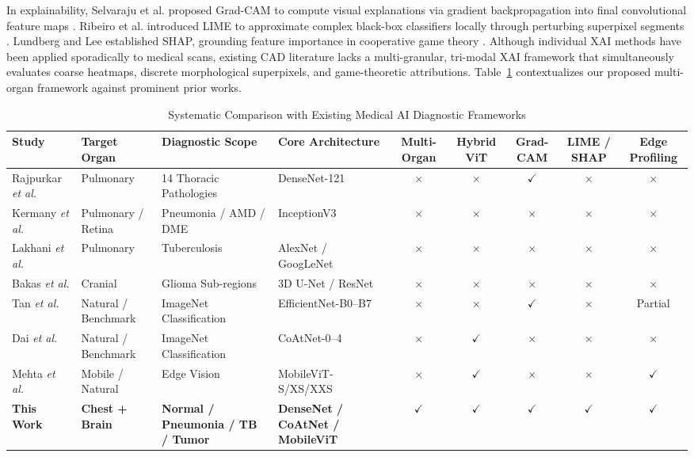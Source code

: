 \documentclass[journal]{IEEEtran}
\begin{document}
In explainability, Selvaraju et al. proposed Grad-CAM to compute visual explanations via gradient backpropagation into final convolutional feature maps \cite{selvaraju2017gradcam}. Ribeiro et al. introduced LIME to approximate complex black-box classifiers locally through perturbing superpixel segments \cite{ribeiro2016lime}. Lundberg and Lee established SHAP, grounding feature importance in cooperative game theory \cite{lundberg2017unified}. Although individual XAI methods have been applied sporadically to medical scans, existing CAD literature lacks a multi-granular, tri-modal XAI framework that simultaneously evaluates coarse heatmaps, discrete morphological superpixels, and game-theoretic attributions. Table~\ref{tab:literature_comparison} contextualizes our proposed multi-organ framework against prominent prior works.

\begin{table}[!t]
\caption{Systematic Comparison with Existing Medical AI Diagnostic Frameworks}
\label{tab:literature_comparison}
\centering
\scriptsize
\renewcommand{\arraystretch}{1.15}
\begin{tabular}{l l l l c c c c c}
\toprule
\textbf{Study} & \textbf{Target Organ} & \textbf{Diagnostic Scope} & \textbf{Core Architecture} & \textbf{Multi-Organ} & \textbf{Hybrid ViT} & \textbf{Grad-CAM} & \textbf{LIME / SHAP} & \textbf{Edge Profiling} \\
\midrule
Rajpurkar \textit{et al.} \cite{rajpurkar2017chexnet} & Pulmonary & 14 Thoracic Pathologies & DenseNet-121 & $\times$ & $\times$ & $\checkmark$ & $\times$ & $\times$ \\
Kermany \textit{et al.} \cite{kermany2018identifying} & Pulmonary / Retina & Pneumonia / AMD / DME & InceptionV3 & $\times$ & $\times$ & $\times$ & $\times$ & $\times$ \\
Lakhani \textit{et al.} \cite{lakhani2017deep} & Pulmonary & Tuberculosis & AlexNet / GoogLeNet & $\times$ & $\times$ & $\times$ & $\times$ & $\times$ \\
Bakas \textit{et al.} \cite{menze2014multimodal} & Cranial & Glioma Sub-regions & 3D U-Net / ResNet & $\times$ & $\times$ & $\times$ & $\times$ & $\times$ \\
Tan \textit{et al.} \cite{tan2019efficientnet} & Natural / Benchmark & ImageNet Classification & EfficientNet-B0--B7 & $\times$ & $\times$ & $\checkmark$ & $\times$ & Partial \\
Dai \textit{et al.} \cite{dai2021coatnet} & Natural / Benchmark & ImageNet Classification & CoAtNet-0--4 & $\times$ & $\checkmark$ & $\times$ & $\times$ & $\times$ \\
Mehta \textit{et al.} \cite{mehta2021mobilevit} & Mobile / Natural & Edge Vision & MobileViT-S/XS/XXS & $\times$ & $\checkmark$ & $\times$ & $\times$ & $\checkmark$ \\
\textbf{This Work} & \textbf{Chest + Brain} & \textbf{Normal / Pneumonia / TB / Tumor} & \textbf{DenseNet / CoAtNet / MobileViT} & $\mathbf{\checkmark}$ & $\mathbf{\checkmark}$ & $\mathbf{\checkmark}$ & $\mathbf{\checkmark}$ & $\mathbf{\checkmark}$ \\
\bottomrule
\end{tabular}
\end{table}
\end{document}

